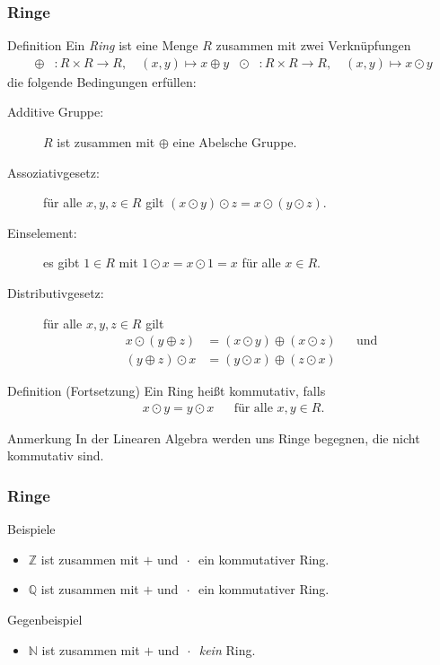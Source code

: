 \documentclass{beamer}
\renewcommand{\emph}[1]{{\textcolor{solarizedRed}{\itshape #1}}}
\newcommand\NN{\mathbb N}
\newcommand\ZZ{\mathbb Z}
\newcommand\QQ{\mathbb Q}
\newcommand{\ue}{\"u}
\renewcommand{\otimes}{\odot}
\begin{document}
\begin{frame}\frametitle{Ringe}
	\begin{overprint}
\begin{block}{Definition}
		Ein \emph{Ring} ist eine Menge $R$ zusammen mit zwei Verkn\ue pfungen
		\begin{align*}
			\oplus&:R\times R\to R,\quad (x,y)\mapsto x\oplus y&\otimes&:R\times R\to R,\quad(x,y)\mapsto x\otimes y
		\end{align*}
		die folgende Bedingungen erf\"ullen:
		\begin{description}
			\item[Additive Gruppe:] $R$ ist zusammen mit $\oplus$ eine Abelsche Gruppe.
			\item[Assoziativgesetz:] f\ue r alle $x,y,z\in R$ gilt $(x\otimes y)\otimes z=x\otimes(y\otimes z)$.
			\item[Einselement:] es gibt $1\in R$ mit $1\otimes x=x\otimes 1=x$ f\ue r alle $x\in R$.
			\item[Distributivgesetz:] f\ue r alle $x,y,z\in R$ gilt
				\begin{align*}
					x\otimes(y\oplus z)&=(x\otimes y)\oplus (x\otimes z)&&\mbox{und}\\
					(y\oplus z)\otimes x&=(y\otimes x)\oplus (z\otimes x)
				\end{align*}
		\end{description}
	\end{block}
	\begin{block}{Definition (Fortsetzung)}
	Ein Ring hei\ss t \alert{kommutativ}, falls	
	\begin{align*}
		x\otimes y=y\otimes x&&\mbox{f\ue r alle }x,y\in R.
	\end{align*}
	\end{block}
	\begin{block}{Anmerkung}
	In der Linearen Algebra werden uns Ringe begegnen, die nicht kommutativ sind.	
	\end{block}
	\end{overprint}
\end{frame}

\begin{frame}\frametitle{Ringe}
	\begin{block}{Beispiele}
		\begin{itemize}
			\item $\ZZ$ ist zusammen mit $+$ und $\,\cdot\,$ ein kommutativer Ring.
			\item $\QQ$ ist zusammen mit $+$ und $\,\cdot\,$ ein kommutativer Ring.
		\end{itemize}
	\end{block}
	\begin{block}{Gegenbeispiel}
		\begin{itemize}
			\item $\NN$ ist zusammen mit $+$ und $\,\cdot\,$ \emph{kein} Ring.
		\end{itemize}
	\end{block}
\end{frame}
\end{document}

